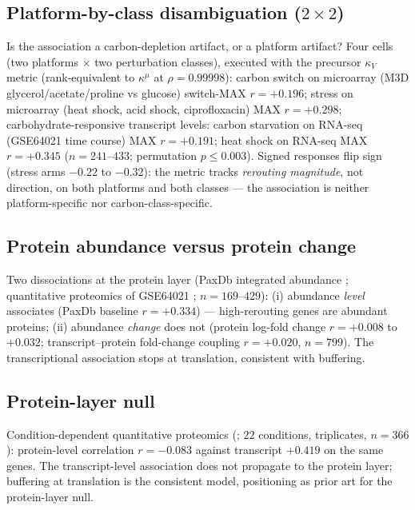 \documentclass[11pt,a4paper]{article}
\theoremstyle{plain}
\theoremstyle{definition}
\theoremstyle{remark}
\newcommand{\kk}{\kappa_{\!V}}
\newcommand{\kmu}{\kappa^{\mu}}
\begin{document}
\subsection{Platform-by-class disambiguation ($2 \times 2$)}
\label{sec:e25}
Is the association a carbon-depletion artifact, or a platform
artifact? Four cells (two platforms $\times$ two perturbation
classes), executed with the precursor $\kk$ metric (rank-equivalent
to $\kmu$ at $\rho = 0.99998$): carbon switch on microarray (M3D
glycerol/acetate/proline vs glucose) switch-MAX $r = +0.196$; stress
on microarray (heat shock, acid shock, ciprofloxacin) MAX $r =
+0.298$; carbohydrate-responsive transcript levels: carbon starvation on RNA-seq (GSE64021 \citep{barrett2013} time course) MAX $r =
+0.191$; heat shock on RNA-seq MAX $r = +0.345$ ($n = 241$--$433$;
permutation $p \le 0.003$). Signed responses flip sign (stress arms
$-0.22$ to $-0.32$): the metric tracks \emph{rerouting magnitude},
not direction, on both platforms and both classes --- the association
is neither platform-specific nor carbon-class-specific.

\subsection{Protein abundance versus protein change}
\label{sec:e26}
Two dissociations at the protein layer (PaxDb integrated
abundance \citep{wang2015}; quantitative proteomics of GSE64021
\citep{barrett2013};
$n = 169$--$429$): (i) abundance
\emph{level} associates (PaxDb baseline $r = +0.334$) ---
high-rerouting genes are abundant proteins; (ii) abundance
\emph{change} does not (protein log-fold change $r = +0.008$ to
$+0.032$; transcript--protein fold-change coupling $r = +0.020$,
$n = 799$). The transcriptional association stops at translation,
consistent with buffering.

\subsection{Protein-layer null}
\label{sec:e27}
Condition-dependent quantitative proteomics (\citet{schmidt2016}; $22$ conditions, triplicates,
$n = 366$): protein-level correlation $r = -0.083$ against transcript
$+0.419$ on the same genes. The transcript-level association does not
propagate to the protein layer; buffering at translation is the consistent
model, positioning \citet{kochanowski2013} as prior art for the protein-layer
null.

\end{document}
